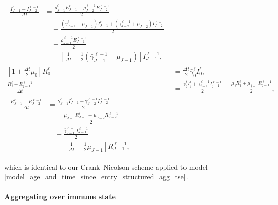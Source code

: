 \documentclass{jpmarticle}
\let\subequationsorig\subequations%
\let\endsubequationsorig\endsubequations%
\renewenvironment{subequations}{
  \subequationsorig
  \renewcommand{\theequation}{\theparentequation.\arabic{equation}}
}{
  \endsubequationsorig
}
\begin{document}
\begin{subequations}
\begin{align}
    \\
    \begin{split}
      \frac{I_{J - 1}^{\ell} - I_{J - 2}^{\ell - 1}}{\Delta t}
      &= \frac{\bar{\rho}_{J - 1}^{\ell} E_{J - 1}^{\ell}
        + \bar{\rho}_{J - 2}^{\ell - 1} E_{J - 2}^{\ell - 1}} {2}
      \\ & \quad {}
      - \frac{(\bar{\gamma}_{J - 1}^{\ell} + \mu_{J - 1}) I_{J - 1}^{\ell}
        + (\bar{\gamma}_{J - 2}^{\ell - 1} + \mu_{J - 2}) I_{J - 2}^{\ell - 1}}
      {2}
      \\ & \quad {}
      + \frac{\bar{\rho}_{J - 1}^{\ell - 1} E_{J - 1}^{\ell - 1}} {2}
      \\ & \quad {}
      + \left[
        \frac{1}{\Delta t}
        - \frac{1}{2} (\bar{\gamma}_{J - 1}^{\ell - 1} + \mu_{J - 1})
      \right] I_{J - 1}^{\ell - 1},
    \end{split}
    \\
    \left[1 + \frac{\Delta t}{2} \mu_0\right] R_0^{\ell}
    &= \frac{\Delta t}{2} \bar{\gamma}_0^{\ell} I_0^{\ell},
    \\
    \frac{R_j^{\ell} - R_{j - 1}^{\ell - 1}}{\Delta t}
    &= \frac{\bar{\gamma}_j^{\ell} I_j^{\ell}
      + \bar{\gamma}_{j - 1}^{\ell - 1} I_{j - 1}^{\ell - 1}}
      {2}
      - \frac{\mu_j R_j^{\ell}
      + \mu_{j - 1} R_{j - 1}^{\ell - 1}}
      {2},
    \\
    \begin{split}
      \frac{R_{J - 1}^{\ell} - R_{J - 2}^{\ell - 1}}{\Delta t}
      &= \frac{\bar{\gamma}_{J - 1}^{\ell} I_{J - 1}^{\ell}
        + \bar{\gamma}_{J - 2}^{\ell - 1} I_{J - 2}^{\ell - 1}}
      {2}
      \\ & \quad {}
      - \frac{\mu_{J - 1} R_{J - 1}^{\ell}
        + \mu_{J - 2} R_{J - 2}^{\ell - 1}}
      {2}
      \\ & \quad {}
      + \frac{\bar{\gamma}_{J - 1}^{\ell - 1} I_{J - 1}^{\ell - 1}}{2}
      \\ & \quad {}
      + \left[
        \frac{1}{\Delta t}
        - \frac{1}{2} \mu_{J - 1}
      \right] R_{J - 1}^{\ell - 1},
    \end{split}
  \end{align}
\end{subequations}
which is identical to our Crank--Nicolson scheme applied to model
\eqref{model_age_and_time_since_entry_structured_agg_tse}.


\paragraph{Aggregating over immune state}
\end{document}
